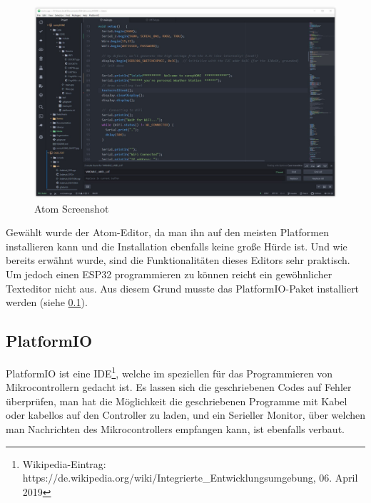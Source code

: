         \begin{figure}[H]
            \centering
            \includegraphics[width=1\textwidth]{./media/images/AtomScreenshot.jpg}
            \caption{Atom Screenshot\cite{bib:Atom}}
            \label{fig:Atom}
        \end{figure}
        
        Gewählt wurde der Atom-Editor, da man ihn auf den meisten Platformen installieren kann und die Installation ebenfalls keine große Hürde ist. Und wie bereits erwähnt wurde, sind die Funktionalitäten dieses Editors sehr praktisch. Um jedoch einen ESP32 programmieren zu können reicht ein gewöhnlicher Texteditor nicht aus. Aus diesem Grund musste das PlatformIO-Paket installiert werden (siehe \ref{ref:PlatformIO}). 
        
    
\pagebreak

    \subsection{PlatformIO}\label{ref:PlatformIO}
    
    PlatformIO ist eine IDE\footnote{Wikipedia-Eintrag: https://de.wikipedia.org/wiki/Integrierte\_Entwicklungsumgebung, 06. April 2019}, welche im speziellen für das Programmieren von Mikrocontrollern gedacht ist. Es lassen sich die geschriebenen Codes auf Fehler überprüfen, man hat die Möglichkeit die geschriebenen Programme mit Kabel oder kabellos auf den Controller zu laden, und ein Serieller Monitor, über welchen man Nachrichten des Mikrocontrollers empfangen kann, ist ebenfalls verbaut.
    
